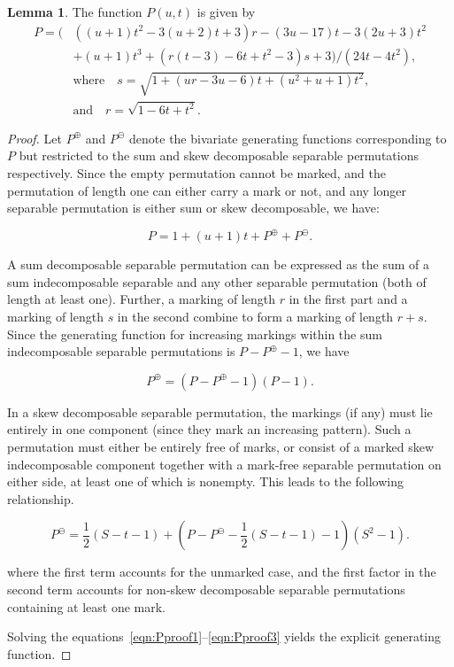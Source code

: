 \documentclass[10pt]{article}
\theoremstyle{definition}
\newtheorem{lemma}[theorem]{Lemma}
\numberwithin{equation}{section}
\numberwithin{figure}{section}
\begin{document}
\begin{lemma}\label{lem:P}
The function $P(u,t)$ is given by
\begin{align*}
    P = 
            \Bigg(&\left( (u+1)t^2 - 3(u+2)t + 3\right)r 
            - (3u - 17)t - 3(2u + 3)t^2 \\ &
            + (u+1)t^3 
            + \left(r(t-3) - 6t + t^2 - 3\right)s + 3\Bigg)/
            (24t - 4t^2), \\
&\text{where} \quad s = 
        \sqrt{1 + (ur-3u-6)t + (u^2 + u + 1)t^2}, \\
&\text{and} \quad r = \sqrt{1 - 6t + t^2}. 
\end{align*}

  \end{lemma}
  \begin{proof}

Let $P^\oplus$ and $P^\ominus$ denote the bivariate generating functions corresponding to $P$  but restricted to the sum and skew decomposable separable permutations respectively. Since the empty permutation cannot be marked, and the permutation of length one can either carry a mark or not, and any longer separable permutation is either sum or skew decomposable, we have: 

\begin{equation}
\label{eqn:Pproof1}
      P = 1 + (u+1)t + P^\oplus + P^\ominus.
\end{equation}

A sum decomposable separable permutation can be expressed as the sum of a sum indecomposable separable and any other separable permutation (both of length at least one). Further, a marking of length $r$ in the first part and a marking of length $s$ in the second combine to form a marking of length $r+s$. Since the generating function for increasing markings within the sum indecomposable separable permutations is $P - P^\oplus - 1$, we have 

\begin{equation} 
\label{eqn:Pproof2}
P^\oplus = (P - P^\oplus - 1)(P - 1).
\end{equation}


In a skew decomposable separable permutation, the markings (if any) must lie entirely in one component (since they mark an increasing pattern).  Such a permutation must either be entirely free of marks, or consist of a marked skew indecomposable component together with a mark-free separable permutation on either side, at least one of which is nonempty. This leads to the following relationship. 

\begin{equation}\label{eqn:Pproof3}
P^\ominus = \frac{1}{2}(S - t - 1) + 
      \left(P - P^\ominus - \frac{1}{2} (S - t - 1) - 1\right) (S^2-1).
\end{equation}

where the first term accounts for the unmarked case, and the first factor in the second term accounts for non-skew decomposable separable permutations containing at least one mark.

Solving the equations~\ref{eqn:Pproof1}--\ref{eqn:Pproof3} yields the explicit generating function. 
\end{proof}
  
\end{document}
